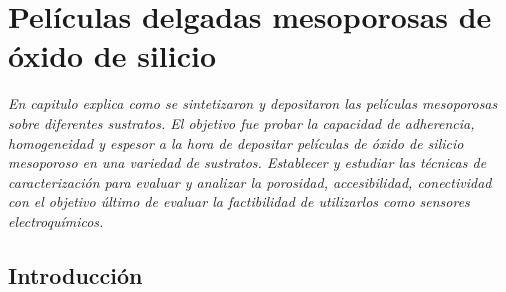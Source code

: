  \newcommand{\NoBiblioMeso}[1]{
 \ifthenelse{\equal{#1}{verdadero}}{}{}
 \NoBiblioMeso{verdadero}}

 
 \FormatoCapituloDosLineas
 
 \chapter{Películas delgadas mesoporosas de óxido de silicio}
 \label{chap:Mesoporosos}

 \thispagestyle{empty}
	
 \noindent\textit{En capitulo explica como se sintetizaron y depositaron las películas mesoporosas sobre diferentes sustratos. El objetivo fue probar la capacidad de adherencia, homogeneidad y espesor a la hora de depositar películas de óxido de silicio mesoporoso en una variedad de sustratos. Establecer y estudiar las técnicas de caracterización para evaluar y analizar la porosidad, accesibilidad, conectividad con el objetivo último de evaluar la factibilidad de utilizarlos como sensores electroquímicos.}
 
 
 \vfill
 \minitoc
 \newpage

\section{Introducción}

